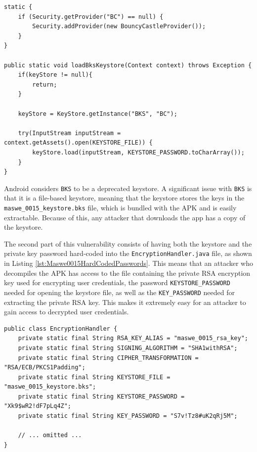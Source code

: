 \begin{lstlisting}[style=JavaStyle, float=tbh, mathescape=true, captionpos=b, caption={Loading \texttt{BC} and using \texttt{BKS} for managing cryptographic keys}, label=lst:Maswe0015UsingBcAndBks]
static {
    if (Security.getProvider("BC") == null) {
        Security.addProvider(new BouncyCastleProvider());
    }
}

public static void loadBksKeystore(Context context) throws Exception {
    if(keyStore != null){
        return;
    }

    keyStore = KeyStore.getInstance("BKS", "BC");

    try(InputStream inputStream = context.getAssets().open(KEYSTORE_FILE)) {
        keyStore.load(inputStream, KEYSTORE_PASSWORD.toCharArray());
    }
}
\end{lstlisting}

Android considers \texttt{BKS} to be a deprecated keystore. A significant issue with \texttt{BKS} is that it is a file-based keystore, meaning that the keystore stores the keys in the \texttt{maswe\_0015\_keystore.bks} file, which is bundled with the APK and is easily extractable. Because of this, any attacker that downloads the app has a copy of the keystore.

The second part of this vulnerability consists of having both the keystore and the private key password hard-coded into the \texttt{EncryptionHandler.java} file, as shown in Listing \ref{lst:Maswe0015HardCodedPasswords}. This means that an attacker who decompiles the APK has access to the file containing the private RSA encryption key used for encrypting user credentials, the password \texttt{KEYSTORE\_PASSWORD} needed for opening the keystore file, as well as the \texttt{KEY\_PASSWORD} needed for extracting the private RSA key. This makes it extremely easy for an attacker to gain access to decrypted user credentials.

\begin{lstlisting}[style=JavaStyle, float=tbh, captionpos=b, caption={Hard-coded passwords for the keystore and private key stored in keystore}, label=lst:Maswe0015HardCodedPasswords]
public class EncryptionHandler {
    private static final String RSA_KEY_ALIAS = "maswe_0015_rsa_key";
    private static final String SIGNING_ALGORITHM = "SHA1withRSA";
    private static final String CIPHER_TRANSFORMATION = "RSA/ECB/PKCS1Padding";
    private static final String KEYSTORE_FILE = "maswe_0015_keystore.bks";
    private static final String KEYSTORE_PASSWORD = "Xk9$wR2!dF7pLq4Z";
    private static final String KEY_PASSWORD = "S7v!Tz8#uK2qRj5M";

    // ... omitted ...
}
\end{lstlisting}


